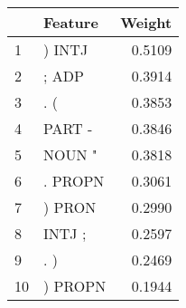 \begin{tabular}{llr}
\toprule
{} &  Feature &  Weight \\
\midrule
1  &   ) INTJ &  0.5109 \\
2  &    ; ADP &  0.3914 \\
3  &      . ( &  0.3853 \\
4  &   PART - &  0.3846 \\
5  &   NOUN " &  0.3818 \\
6  &  . PROPN &  0.3061 \\
7  &   ) PRON &  0.2990 \\
8  &   INTJ ; &  0.2597 \\
9  &      . ) &  0.2469 \\
10 &  ) PROPN &  0.1944 \\
\bottomrule
\end{tabular}
